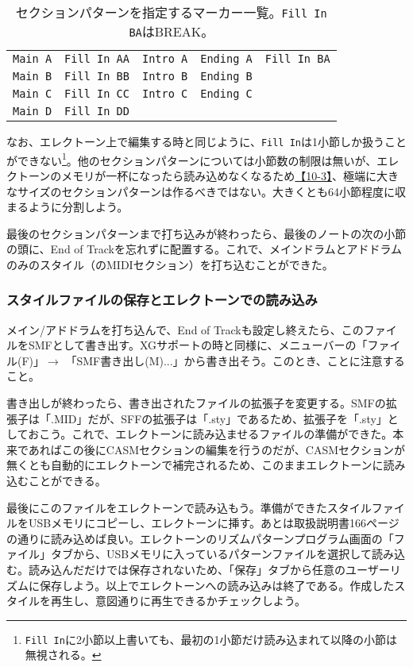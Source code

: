 \documentclass[uplatex, 10pt, dvipdfmx]{jsarticle}
\numberwithin{equation}{section}
\newcommand{\emphj}[1]{\textbf{\textrm{\textgt{{#1}}}}}
\begin{document}
\begin{table}[h]
\caption{セクションパターンを指定するマーカー一覧。\texttt{Fill In BA}はBREAK。}
\label{marker}
\centering
\begin{tabular}{|c|c|c|c|c|}
\hline
\texttt{Main A} & \texttt{Fill In AA} & \texttt{Intro A} & \texttt{Ending A} & \texttt{Fill In BA} \\
\texttt{Main B} & \texttt{Fill In BB} & \texttt{Intro B} & \texttt{Ending B} & \\
\texttt{Main C} & \texttt{Fill In CC} & \texttt{Intro C} & \texttt{Ending C} & \\
\texttt{Main D} & \texttt{Fill In DD} & & & \\
\hline
\end{tabular}
\end{table}

なお、エレクトーン上で編集する時と同じように、\texttt{Fill In}は1小節しか扱うことができない\footnote{\texttt{Fill In}に2小節以上書いても、最初の1小節だけ読み込まれて以降の小節は無視される。}。他のセクションパターンについては小節数の制限は無いが、エレクトーンのメモリが一杯になったら読み込めなくなるため\href{http://els01stylefile.music.coocan.jp/Stagea_Style/Stagea_Style_P1003.htm}{【10-3】}、極端に大きなサイズのセクションパターンは作るべきではない。大きくとも64小節程度に収まるように分割しよう。

最後のセクションパターンまで打ち込みが終わったら、最後のノートの次の小節の頭に、End of Trackを忘れずに配置する。これで、メインドラムとアドドラムのみのスタイル（のMIDIセクション）を打ち込むことができた。

\subsubsection{スタイルファイルの保存とエレクトーンでの読み込み}
メイン/アドドラムを打ち込んで、End of Trackも設定し終えたら、このファイルをSMFとして書き出す。XGサポートの時と同様に、メニューバーの「ファイル(F)」$\rightarrow$ 「SMF書き出し(M)...」から書き出そう。このとき、\emphj{「Format 0」としてSMF書き出しする}ことに注意すること。

書き出しが終わったら、書き出されたファイルの拡張子を変更する。SMFの拡張子は「.MID」だが、SFFの拡張子は「.sty」であるため、拡張子を「.sty」としておこう。これで、エレクトーンに読み込ませるファイルの準備ができた。本来であればこの後にCASMセクションの編集を行うのだが、CASMセクションが無くとも自動的にエレクトーンで補完されるため、このままエレクトーンに読み込むことができる。

最後にこのファイルをエレクトーンで読み込もう。準備ができたスタイルファイルをUSBメモリにコピーし、エレクトーンに挿す。あとは取扱説明書\cite{取説}166ページの通りに読み込めば良い。エレクトーンのリズムパターンプログラム画面の「ファイル」タブから、USBメモリに入っているパターンファイルを選択して読み込む。読み込んだだけでは保存されないため、「保存」タブから任意のユーザーリズムに保存しよう。以上でエレクトーンへの読み込みは終了である。作成したスタイルを再生し、意図通りに再生できるかチェックしよう。
\end{document}
